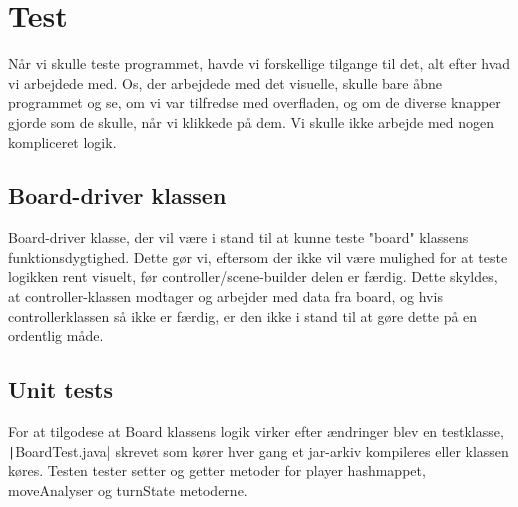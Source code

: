 \section{Test}
Når vi skulle teste programmet, havde vi forskellige tilgange til det, alt efter hvad vi arbejdede med. Os, der arbejdede med det visuelle, skulle bare åbne programmet og se, om vi var tilfredse med overfladen, og om de diverse knapper gjorde som de skulle, når vi klikkede på dem. Vi skulle ikke arbejde med nogen kompliceret logik. 
\subsection{Board-driver klassen}
Board-driver klasse, der vil være i stand til at kunne teste "board" klassens funktionsdygtighed. Dette gør vi, eftersom der ikke vil være mulighed for at teste logikken rent visuelt, før controller/scene-builder delen er færdig. Dette skyldes, at controller-klassen modtager og arbejder med data fra board, og hvis controllerklassen så ikke er færdig, er den ikke i stand til at gøre dette på en ordentlig måde.
\subsection{Unit tests}\label{sec:unitTests}
For at tilgodese at Board klassens logik virker efter ændringer blev en testklasse, \texttt|BoardTest.java| skrevet som kører hver gang et jar-arkiv kompileres eller klassen køres. Testen tester setter og getter metoder for player hashmappet, moveAnalyser og turnState metoderne.